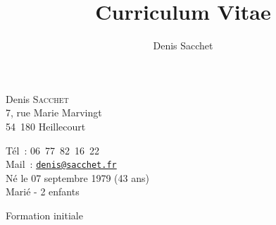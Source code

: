 \documentclass[dvipdfmx]{article}
\title{Curriculum Vitae}
\author{Denis Sacchet}
\begin{document}
\noindent\hspace*{\tabcolsep}
\begin{minipage}{0.5\linewidth}
{\large Denis \textsc{Sacchet}}\\
7, rue Marie Marvingt\\
54~180 Heillecourt
\end{minipage}
\begin{minipage}{0.4\linewidth}
T\'el~: 06~77~82~16~22\\
Mail~: \texttt{\href{mailto:denis@sacchet.fr}{denis@sacchet.fr}}\\
N\'e le 07 septembre 1979 (43 ans)\\
Mari\'e - 2 enfants
\end{minipage}

\begin{rubrique}{Formation initiale}

\begin{sousrubrique}
\end{sousrubrique}

\begin{sousrubrique}
\end{sousrubrique}

\end{rubrique}
\end{document}
